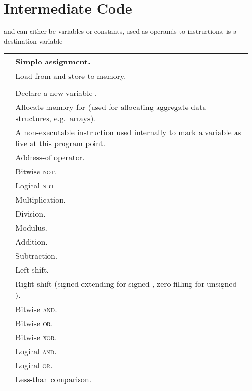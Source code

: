 \documentclass[../00-main.tex]{subfiles}
\begin{document}
\chapter{Intermediate Code}\label{app:intermediate code}

 and  can either be variables or constants, used as operands to instructions.
 is a destination variable.

\begin{xltabular}{\textwidth}{lX}
\toprule
{} & Simple assignment. \\
\midrule
{} & Load from and store to memory. \\
 &  \\
\midrule
{} & Declare a new variable . \\
 & Allocate memory for  (used for allocating aggregate data structures, e.g.~arrays). \\
\midrule
{} & A non-executable instruction used internally to mark a variable as live at this program point. \\
\midrule
{} & Address-of operator. \\
 & Bitwise \textsc{not}. \\
 & Logical \textsc{not}. \\
\midrule
{} & Multiplication. \\
 & Division. \\
 & Modulus. \\
 & Addition. \\
 & Subtraction. \\
 & Left-shift. \\
 & Right-shift (signed-extending for signed , zero-filling for unsigned ). \\
 & Bitwise \textsc{and}. \\
 & Bitwise \textsc{or}. \\
 & Bitwise \textsc{xor}. \\
 & Logical \textsc{and}. \\
 & Logical \textsc{or}. \\
 & Less-than comparison. \\

\end{xltabular}
\end{document}
